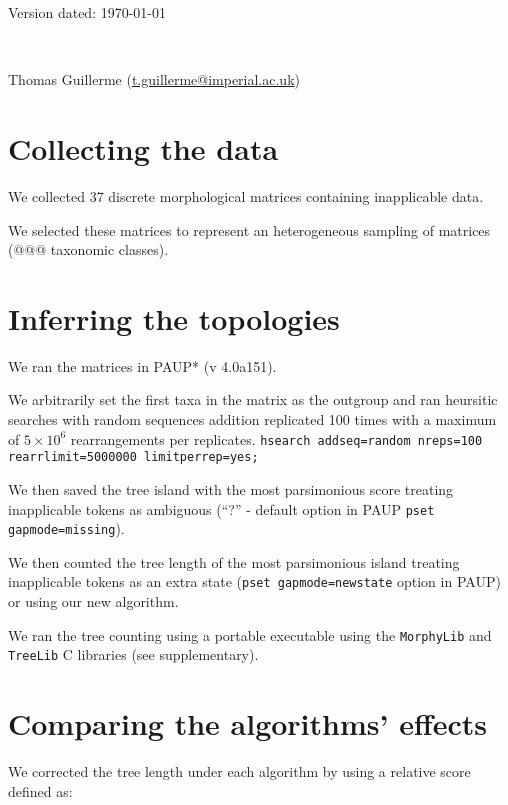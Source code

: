 \documentclass[a4paper,11pt]{article}
\begin{document}
\begin{flushright}
Version dated: \today
\end{flushright}
\begin{center}

\\
\bigskip

Thomas Guillerme (\href{mailto:t.guillerme@imperial.ac.uk}{t.guillerme@imperial.ac.uk})

\end{center}

\section{Collecting the data}
We collected 37 discrete morphological matrices containing inapplicable data.

We selected these matrices to represent an heterogeneous sampling of matrices (@@@ taxonomic classes).


\section{Inferring the topologies}
We ran the matrices in PAUP* (v 4.0a151).

We arbitrarily set the first taxa in the matrix as the outgroup and ran heursitic searches with random sequences addition replicated 100 times with a maximum of $5 \times 10^6$ rearrangements per replicates. \texttt{hsearch addseq=random nreps=100 rearrlimit=5000000 limitperrep=yes;}

We then saved the tree island with the most parsimonious score treating inapplicable tokens as ambiguous (``?'' - default option in PAUP \texttt{pset gapmode=missing}).

We then counted the tree length of the most parsimonious island treating inapplicable tokens as an extra state (\texttt{pset gapmode=newstate} option in PAUP) or using our new algorithm.

We ran the tree counting using a portable executable using the \texttt{MorphyLib} and \texttt{TreeLib} C libraries (see supplementary).


\section{Comparing the algorithms' effects}
We corrected the tree length under each algorithm by using a relative score defined as:
\end{document}
